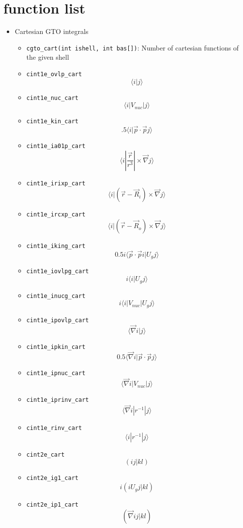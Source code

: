 \documentclass{article}
\begin{document}
\section{function list}

\begin{itemize}
\item
  Cartesian GTO integrals
  \begin{itemize}
  \item
    \verb!cgto_cart(int ishell, int bas[])!: Number of cartesian
    functions of the given shell
  \item
    \verb!cint1e_ovlp_cart! \[\langle i| j\rangle \]
  \item
    \verb!cint1e_nuc_cart! \[\langle i| V_{nuc} | j\rangle \]
  \item
    \verb!cint1e_kin_cart!
    \[.5\langle i| \vec{p} \cdot \vec{p} j\rangle \]
  \item
    \verb!cint1e_ia01p_cart!
    \[\langle i| \frac{\vec{r}}{r^3}| \times \vec{\nabla} j\rangle \]
  \item
    \verb!cint1e_irixp_cart!
    \[\langle i| (\vec{r}-\vec{R}_i) \times \vec{\nabla} j\rangle \]
  \item
    \verb!cint1e_ircxp_cart!
    \[\langle i| (\vec{r}-\vec{R}_o) \times \vec{\nabla} j\rangle \]
  \item
    \verb!cint1e_iking_cart!
    \[0.5i\langle \vec{p} \cdot \vec{p} i| U_gj\rangle \]
  \item
    \verb!cint1e_iovlpg_cart! \[i \langle i| U_gj\rangle \]
  \item
    \verb!cint1e_inucg_cart! \[i \langle i| V_{nuc}| U_gj\rangle \]
  \item
    \verb!cint1e_ipovlp_cart! \[\langle \vec{\nabla} i|j\rangle \]
  \item
    \verb!cint1e_ipkin_cart!
    \[0.5\langle \vec{\nabla} i| \vec{p} \cdot \vec{p} j\rangle \]
  \item
    \verb!cint1e_ipnuc_cart!
    \[\langle \vec{\nabla} i| V_{nuc}|j\rangle \]
  \item
    \verb!cint1e_iprinv_cart!
    \[\langle \vec{\nabla} i| r^{-1}|j\rangle \]
  \item
    \verb!cint1e_rinv_cart! \[\langle i| r^{-1} |j\rangle \]
  \item
    \verb!cint2e_cart! \[(ij|kl)\]
  \item
    \verb!cint2e_ig1_cart! \[i(i U_g j|kl)\]
  \item
    \verb!cint2e_ip1_cart! \[(\vec{\nabla} i j|kl)\]
  \end{itemize}

\end{itemize}
\end{document}
